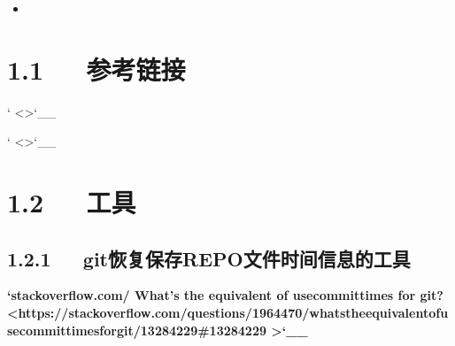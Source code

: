 \documentclass[letterpaper,12pt,english]{sphinxmanual}
\begin{document}
\begin{sphinxShadowBox}
\begin{itemize}
\begin{itemize}
\begin{itemize}
\begin{itemize}
\end{itemize}

\item {} 
\label{\detokenize{001software/001install/001._u7f51_u7ad9/github:id33}}{\hyperref[\detokenize{001software/001install/001._u7f51_u7ad9/github:id7}]{}}

\end{itemize}

\end{itemize}

\end{itemize}
\end{sphinxShadowBox}


\section{1.1   参考链接}
\label{\detokenize{001software/001install/001._u7f51_u7ad9/github:id1}}







` <>`\_\_

` <>`\_\_


\section{1.2   工具}
\label{\detokenize{001software/001install/001._u7f51_u7ad9/github:id2}}

\subsection{1.2.1   git恢复保存REPO文件时间信息的工具\sphinxhyphen{}}
\label{\detokenize{001software/001install/001._u7f51_u7ad9/github:gitrepo}}
{\color{red}\bfseries{}`stackoverflow.com/ What's the equivalent of use\sphinxhyphen{}commit\sphinxhyphen{}times for git? <https://stackoverflow.com/questions/1964470/whats\sphinxhyphen{}the\sphinxhyphen{}equivalent\sphinxhyphen{}of\sphinxhyphen{}use\sphinxhyphen{}commit\sphinxhyphen{}times\sphinxhyphen{}for\sphinxhyphen{}git/13284229\#13284229
>`\_\_}
\end{document}
